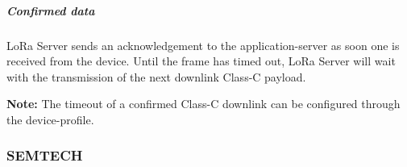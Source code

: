 \subparagraph{Confirmed data}
LoRa Server sends an acknowledgement to the application-server as soon one is received from the device.
Until the frame has timed out,
	LoRa Server will wait with the transmission of the next downlink Class-C payload.

\textbf{Note:} The timeout of a confirmed Class-C downlink can be configured through the device-profile.




\subsubsection{SEMTECH}



